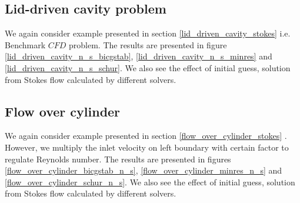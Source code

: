 \documentclass[a4paper]{book}
\begin{document}
\subsection{Lid-driven cavity problem} \label{lid_driven_cavity_navier_stokes}

We again consider example presented in section \ref{lid_driven_cavity_stokes} i.e. Benchmark $CFD$ problem. The results are presented in figure \ref{lid_driven_cavity_n_s_bicgstab}, \ref{lid_driven_cavity_n_s_minres} and \ref{lid_driven_cavity_n_s_schur}. We also see the effect of initial guess, solution from Stokes flow calculated by different solvers.

\subsection{Flow over cylinder} \label{flow_over_cylinder_navier_stokes}

We again consider example presented in section \ref{flow_over_cylinder_stokes} . However, we multiply the inlet velocity on left boundary with certain factor to regulate Reynolds number. The results are presented in figures \ref{flow_over_cylinder_bicgstab_n_s}, \ref{flow_over_cylinder_minres_n_s} and \ref{flow_over_cylinder_schur_n_s}. We also see the effect of initial guess, solution from Stokes flow calculated by different solvers. 
\end{document}
